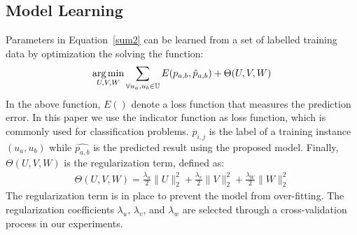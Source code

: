 \subsection{Model Learning}

Parameters in Equation~\ref{sum2} can be learned from a set of labelled training data by optimization the solving the function:
\begin{align}\label{opt}
\operatorname*{arg\,min}_{U, V, W} \sum_{ \forall u_a, u_b \in \mathbb{U} } E( p_{a,b}, \hat{p}_{a,b} ) + \Theta(U, V, W)
\end{align}
In the above function, $E()$ denote a loss function that measures the prediction error. In this paper we use the indicator function as loss function, which is commonly used for classification problems. $p_{i,j}$ is the label of a training instance $(u_a, u_b)$ while $ \hat{p_{a,b}}$ is the predicted result using the proposed model. Finally, $\Theta(U, V, W)$ is the regularization term, defined as:
\begin{align}
\Theta(U, V, W) = \frac{\lambda_u}{2} \| U \|_2^2 + \frac{\lambda_v}{2} \| V \|_2^2 + \frac{\lambda_W}{2} \| W \|_2^2
\end{align}
The regularization term is in place to prevent the model from over-fitting. The regularization coefficients $\lambda_u$, $\lambda_v$, and $\lambda_w$ are selected through a cross-validation process in our experiments.